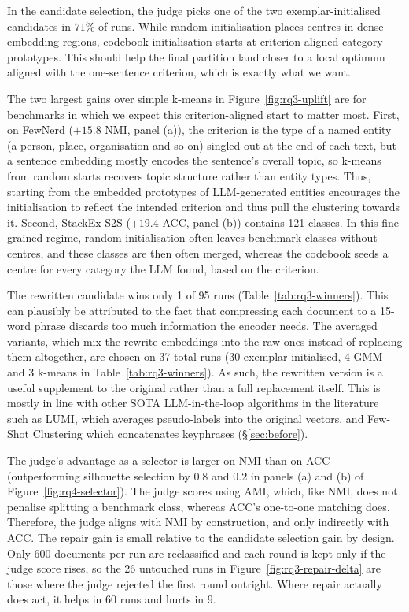 \documentclass[11pt,a4paper,oneside]{report}
\begin{document}
In the candidate selection, the judge picks one of the two
exemplar-initialised candidates in $71\%$ of runs. While random initialisation places centres in dense embedding regions, codebook initialisation starts at criterion-aligned category prototypes. This should help the final partition land closer to a local optimum aligned with the one-sentence criterion, which is exactly what we want.

The two largest gains over simple k-means in Figure~\ref{fig:rq3-uplift} are for benchmarks in which we expect this criterion-aligned start to matter most. First, on FewNerd ($+15.8$ NMI, panel (a)), the criterion is the type of a named entity (a
person, place, organisation and so on) singled out at the end of each
text, but a sentence embedding mostly encodes the sentence's overall
topic, so k-means from random starts recovers topic structure rather
than entity types. Thus, starting from the embedded prototypes of LLM-generated entities encourages the initialisation to reflect the intended criterion and thus pull the clustering towards it. Second, StackEx-S2S ($+19.4$ ACC, panel (b)) contains 121 classes. In this fine-grained regime, random initialisation often leaves benchmark classes without centres, and these classes are then often merged, whereas the codebook seeds a centre for every category the LLM found, based on the criterion.

The rewritten candidate wins only 1 of 95 runs
(Table~\ref{tab:rq3-winners}). This can plausibly be attributed to the fact that compressing each document to a 15-word phrase discards too much information the encoder needs. The averaged variants, which mix the rewrite embeddings into the raw ones instead of replacing
them altogether, are chosen on 37 total runs (30 exemplar-initialised, 4 GMM and 3 k-means in Table~\ref{tab:rq3-winners}). As such, the rewritten version is a useful supplement to the original rather than a full replacement itself. This is mostly in line with other SOTA LLM-in-the-loop algorithms in the literature such as LUMI, which averages pseudo-labels into the original vectors, and Few-Shot Clustering which concatenates keyphrases (\S\ref{sec:before}).


The judge's advantage as a selector is larger on NMI than on ACC (outperforming silhouette selection by 0.8 and 0.2 in panels (a) and (b) of Figure~\ref{fig:rq4-selector}). The judge scores using AMI, which, like NMI, does not penalise splitting a benchmark class, whereas ACC's one-to-one matching does. Therefore, the judge aligns with NMI by construction, and only indirectly with ACC. The repair gain is small relative to the candidate selection gain by design. Only 600 documents per run are reclassified and each round is kept only if
the judge score rises, so the 26 untouched runs in
Figure~\ref{fig:rq3-repair-delta} are those where the judge rejected the
first round outright. Where repair actually does act, it helps in 60 runs and hurts in 9. 
\end{document}
